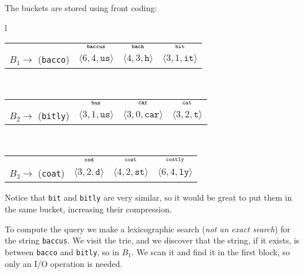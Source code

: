 %
The buckets are stored using front coding:
%
\begin{longtable}{l}
  \begin{tabular}{rccc}
    \null & $\null_\texttt{baccus}$ & $\null_\texttt{bach}$ &
    $\null_\texttt{bit}$ \\
    $B_1 \rightarrow$ (\texttt{bacco}) & $\langle 6, 4, \texttt{us} \rangle$ &
    $\langle 4, 3, \texttt{h} \rangle$ & $\langle 3, 1, \texttt{it} \rangle$ \\
  \end{tabular} \\
  \begin{tabular}{rccc}
    \null & $\null_\texttt{bus}$ & $\null_\texttt{car}$ & $\null_\texttt{cat}$\\
    $B_2 \rightarrow$ (\texttt{bitly}) & $\langle 3, 1, \texttt{us} \rangle$ &
    $\langle 3, 0, \texttt{car} \rangle$ & $\langle 3, 2, \texttt{t} \rangle$ \\
  \end{tabular} \\
  \begin{tabular}{rccc}
    \null & $\null_\texttt{cod}$ & $\null_\texttt{cost}$ &
    $\null_\texttt{costly}$ \\
    $B_3 \rightarrow$ (\texttt{coat}) & $\langle 3, 2, \texttt{d} \rangle$ &
    $\langle 4, 2, \texttt{st} \rangle$ & $\langle 6, 4, \texttt{ly} \rangle$ \\
  \end{tabular}
\end{longtable}
%
Notice that \texttt{bit} and \texttt{bitly} are very similar, so it would be
great to put them in the same bucket, increasing their compression.

To compute the query we make a lexicographic search (\emph{not an exact search})
for the string \texttt{baccus}. We visit the trie, and we discover that the
string, if it exists, is between \texttt{bacco} and \texttt{bitly}, so in $B_1$.
We scan it and find it in the first block, so only an I/O operation is needed.
